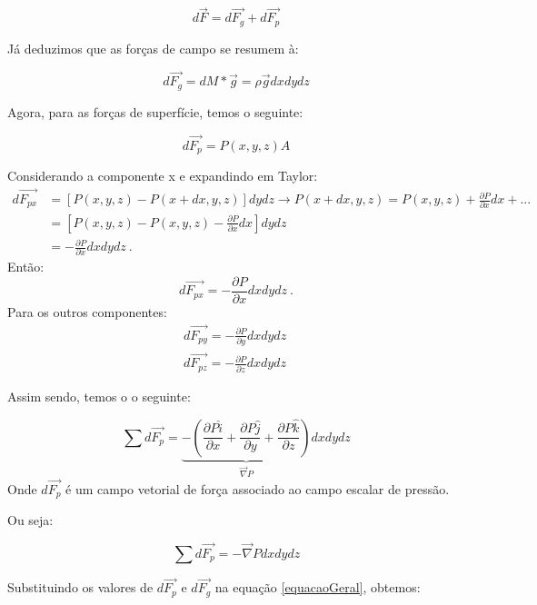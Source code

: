\documentclass{article}
\newcommand{\uvec}[1]{\boldsymbol{\hat{\textit{#1}}}}
\begin{document}
\begin{equation}
     d\vec{F}=d\vec{F_g}+d\vec{F_p}
     \label{equacaoGeral}
\end{equation}

Já deduzimos que as forças de campo se resumem à:

\begin{equation}
     d\vec{F_g}=dM*\vec{g}=\rho \vec{g} dxdydz
\end{equation}

Agora, para as forças de superfície, temos o seguinte:

\begin{equation}
     d\vec{F_p}=P(x,y,z)A
\end{equation}

Considerando a componente x e expandindo em Taylor:
\begin{align*}
d\vec{F_{px}} &= [P(x,y,z)-P(x+dx,y,z)]dydz \rightarrow  P(x+dx,y,z)=P(x,y,z)+\frac{\partial P}{\partial x}dx+...\\ 
&= \left[P(x,y,z)-P(x,y,z)-\frac{\partial P}{\partial x}dx\right]dydz\\
&= -\frac{\partial P}{\partial x}dxdydz\ .
\end{align*}
Então: 
\begin{equation}
    d\vec{F_{px}}= -\frac{\partial P}{\partial x}dxdydz\ .
\end{equation}
Para os outros componentes:
\begin{align}
d\vec{F_{py}}= -\frac{\partial P}{\partial y}dxdydz \\    
d\vec{F_{pz}}= -\frac{\partial P}{\partial z}dxdydz \
\end{align}

Assim sendo, temos o o seguinte:

\begin{equation}
     \sum{d\vec{F_p}} = \underbrace{-\left(\frac{\partial P\uvec{i}}{\partial x} + \frac{\partial P\uvec{j}}{\partial y} + \frac{\partial P\uvec{k}}{\partial z}\right)}_{\vec{\nabla} P}dxdydz
\end{equation}
Onde $d\vec{F_p}$ é um campo vetorial de força associado ao campo escalar de pressão.

Ou seja:

\begin{equation}
     \sum{d\vec{F_p}}=-\vec{\nabla}Pdxdydz 
\end{equation}

Substituindo os valores de $d\vec{F_p}$ e $d\vec{F_g}$ na equação \ref{equacaoGeral}, obtemos:
\end{document}
